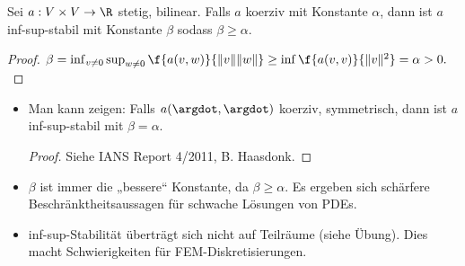 \begin{st} \label{3.33}
	Sei $a: V \times V \to \R$ stetig, bilinear.
	Falls $a$ koerziv mit Konstante $\alpha$, dann ist $a$ inf-sup-stabil mit Konstante $\beta$ sodass $\beta \ge \alpha$.
	\begin{proof}
		\begin{math}
			\beta
			= \inf_{v\neq 0} \sup_{w\neq 0} \f{a(v,w)}{\|v\|\|w\|}
			\ge \inf \f{a(v,v)}{\|v\|^2}
			= \alpha
			> 0.
		\end{math}
	\end{proof}
\end{st}

\begin{note}
	\begin{itemize}
		\item
			Man kann zeigen:
			Falls $a(\argdot, \argdot)$ koerziv, symmetrisch, dann ist $a$ inf-sup-stabil mit $\beta = \alpha$.
			\begin{proof}
				Siehe IANS Report 4/2011, B. Haasdonk.
			\end{proof}
		\item
			$\beta$ ist immer die „bessere“ Konstante, da $\beta \ge \alpha$.
			Es ergeben sich schärfere Beschränktheitsaussagen für schwache Lösungen von PDEs.
		\item
			inf-sup-Stabilität überträgt sich nicht auf Teilräume (siehe Übung).
			Dies macht Schwierigkeiten für FEM-Diskretisierungen.
	\end{itemize}
\end{note}

